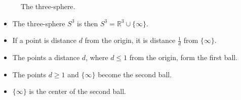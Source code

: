 \documentclass[titlepage]{article}
\numberwithin{figure}{section}
\numberwithin{table}{section}
\numberwithin{equation}{section}
\begin{document}
\begin{itemize}
\begin{itemize}
\begin{figure}[h!]
            \caption{The three-sphere.}
            \label{fig:3-sphere}
        \end{figure}
        \begin{itemize}
            \item The three-sphere $S^3$ is then $S^3=\mathbb{R}^3\cup\{\infty\}$.
            \item If a point is distance $d$ from the origin, it is distance $\frac{1}{d}$ from $\{\infty\}$.
            \item The points a distance $d$, where $d\leq 1$ from the origin, form the first ball.
            \item The points $d\geq 1$ and $\{\infty\}$ become the second ball.
            \item $\{\infty\}$ is the center of the second ball.
        \end{itemize}
    \end{itemize}
\end{itemize}
\end{document}
